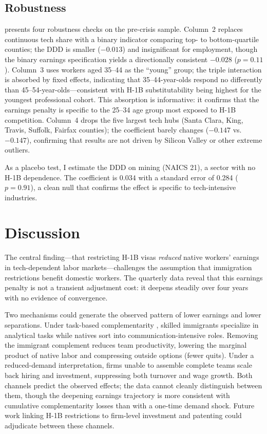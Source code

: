 \documentclass[12pt]{article}
\begin{document}


\subsection{Robustness}

 presents four robustness checks on the pre-crisis sample. Column~2 replaces continuous tech share with a binary indicator comparing top- to bottom-quartile counties; the DDD is smaller ($-0.013$) and insignificant for employment, though the binary earnings specification yields a directionally consistent $-0.028$ ($p = 0.11$). Column~3 uses workers aged 35--44 as the ``young'' group; the triple interaction is absorbed by fixed effects, indicating that 35--44-year-olds respond no differently than 45--54-year-olds---consistent with H-1B substitutability being highest for the youngest professional cohort. This absorption is informative: it confirms that the earnings penalty is specific to the 25--34 age group most exposed to H-1B competition. Column~4 drops the five largest tech hubs (Santa Clara, King, Travis, Suffolk, Fairfax counties); the coefficient barely changes ($-0.147$ vs.\ $-0.147$), confirming that results are not driven by Silicon Valley or other extreme outliers.

As a placebo test, I estimate the DDD on mining (NAICS 21), a sector with no H-1B dependence. The coefficient is $0.034$ with a standard error of 0.284 ($p = 0.91$), a clean null that confirms the effect is specific to tech-intensive industries.



\section{Discussion}

The central finding---that restricting H-1B visas \textit{reduced} native workers' earnings in tech-dependent labor markets---challenges the assumption that immigration restrictions benefit domestic workers. The quarterly data reveal that this earnings penalty is not a transient adjustment cost: it deepens steadily over four years with no evidence of convergence.

Two mechanisms could generate the observed pattern of lower earnings and lower separations. Under task-based complementarity \citep{peri2009task}, skilled immigrants specialize in analytical tasks while natives sort into communication-intensive roles. Removing the immigrant complement reduces team productivity, lowering the marginal product of native labor and compressing outside options (fewer quits). Under a reduced-demand interpretation, firms unable to assemble complete teams scale back hiring and investment, suppressing both turnover and wage growth. Both channels predict the observed effects; the data cannot cleanly distinguish between them, though the deepening earnings trajectory is more consistent with cumulative complementarity losses than with a one-time demand shock. Future work linking H-1B restrictions to firm-level investment and patenting could adjudicate between these channels.
\end{document}
